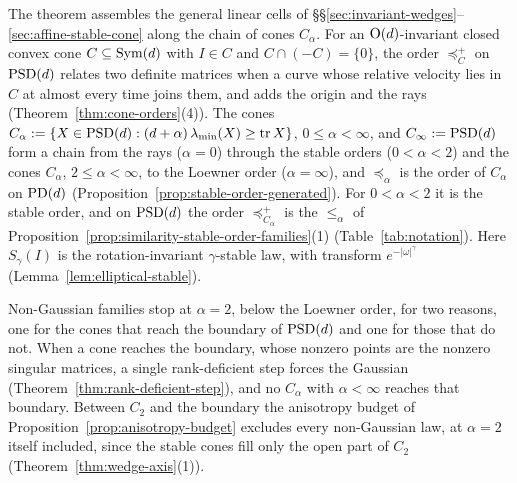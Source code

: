 The theorem assembles the general linear cells of
\S\S\ref{sec:invariant-wedges}--\ref{sec:affine-stable-cone} along the chain of cones $C_\alpha$. For an
$\mathrm{O}(d)$-invariant closed convex cone $C \subseteq \mathrm{Sym}(d)$
with $I \in C$ and $C \cap (-C) = \{0\}$, the order $\preceq^+_C$ on $\mathrm{PSD}(d)$ relates two definite
matrices when a curve whose relative velocity lies in $C$ at almost every time joins them, and adds the
origin and the rays (Theorem~\ref{thm:cone-orders}(4)). The cones
$C_\alpha := \{X \in \mathrm{PSD}(d) : (d+\alpha)\,\lambda_{\min}(X) \ge \operatorname{tr} X\}$, $0 \le \alpha < \infty$, and
$C_\infty := \mathrm{PSD}(d)$ form a chain from the rays ($\alpha = 0$) through the stable orders
($0 < \alpha < 2$) and the cones $C_\alpha$, $2 \le \alpha < \infty$, to the Loewner order
($\alpha = \infty$), and $\preceq_\alpha$ is the order of
$C_\alpha$ on $\mathrm{PD}(d)$ (Proposition~\ref{prop:stable-order-generated}). For $0 < \alpha < 2$ it is the stable
order, and on $\mathrm{PSD}(d)$ the order $\preceq^+_{C_\alpha}$ is the $\le_\alpha$ of
Proposition~\ref{prop:similarity-stable-order-families}(1) (Table~\ref{tab:notation}). Here $S_\gamma(I)$ is the rotation-invariant
$\gamma$-stable law, with transform $e^{-|\omega|^\gamma}$ (Lemma~\ref{lem:elliptical-stable}).

Non-Gaussian families stop at $\alpha = 2$, below the Loewner order, for two reasons, one for the cones
that reach the boundary of $\mathrm{PSD}(d)$ and one for those that do not. When a cone reaches the boundary,
whose nonzero points are the nonzero singular matrices, a single rank-deficient step forces the Gaussian
(Theorem~\ref{thm:rank-deficient-step}), and no $C_\alpha$ with $\alpha < \infty$ reaches that boundary.
Between $C_2$ and the boundary the anisotropy budget of Proposition~\ref{prop:anisotropy-budget}
excludes every non-Gaussian law, at $\alpha = 2$ itself included, since the stable cones fill only the
open part of $C_2$ (Theorem~\ref{thm:wedge-axis}(1)).

